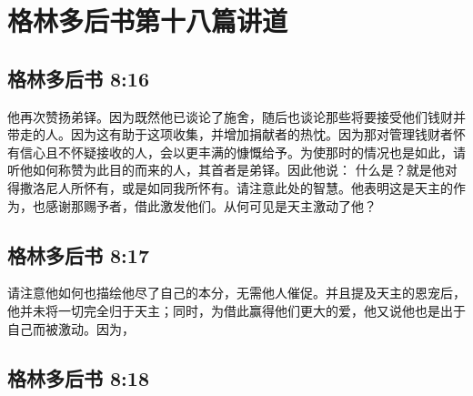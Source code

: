 \section{格林多后书第十八篇讲道}


\subsection{格林多后书 8:16}

\par

他再次赞扬弟铎。因为既然他已谈论了施舍，随后也谈论那些将要接受他们钱财并带走的人。因为这有助于这项收集，并增加捐献者的热忱。因为那对管理钱财者怀有信心且不怀疑接收的人，会以更丰满的慷慨给予。为使那时的情况也是如此，请听他如何称赞为此目的而来的人，其首者是弟铎。因此他说： 什么是？就是他对得撒洛尼人所怀有，或是如同我所怀有。请注意此处的智慧。他表明这是天主的作为，也感谢那赐予者，借此激发他们。从何可见是天主激动了他？\par


\subsection{格林多后书 8:17}

\par

请注意他如何也描绘他尽了自己的本分，无需他人催促。并且提及天主的恩宠后，他并未将一切完全归于天主；同时，为借此赢得他们更大的爱，他又说他也是出于自己而被激动。因为，\par


\subsection{格林多后书 8:18}

